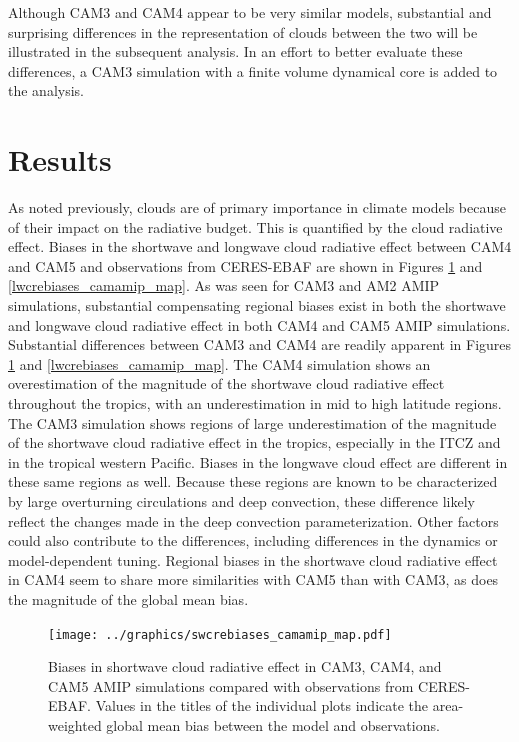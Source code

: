 Although CAM3 and CAM4 appear to be very similar models, substantial and surprising differences in the representation of clouds between the two will be illustrated in the subsequent analysis. In an effort to better evaluate these differences, a CAM3 simulation with a finite volume dynamical core is added to the analysis.

\section{Results}
As noted previously, clouds are of primary importance in climate models because of their impact on the radiative budget. This is quantified by the cloud radiative effect. Biases in the shortwave and longwave cloud radiative effect between CAM4 and CAM5 and observations from CERES-EBAF are shown in Figures \ref{swcrebiases_camamip_map} and \ref{lwcrebiases_camamip_map}. As was seen for CAM3 and AM2 AMIP simulations, substantial compensating regional biases exist in both the shortwave and longwave cloud radiative effect in both CAM4 and CAM5 AMIP simulations. Substantial differences between CAM3 and CAM4 are readily apparent in Figures \ref{swcrebiases_camamip_map} and \ref{lwcrebiases_camamip_map}. The CAM4 simulation shows an overestimation of the magnitude of the shortwave cloud radiative effect throughout the tropics, with an underestimation in mid to high latitude regions. The CAM3 simulation shows regions of large underestimation of the magnitude of the shortwave cloud radiative effect in the tropics, especially in the ITCZ and in the tropical western Pacific. Biases in the longwave cloud effect are different in these same regions as well. Because these regions are known to be characterized by large overturning circulations and deep convection, these difference likely reflect the changes made in the deep convection parameterization. Other factors could also contribute to the differences, including differences in the dynamics or model-dependent tuning. Regional biases in the shortwave cloud radiative effect in CAM4 seem to share more similarities with CAM5 than with CAM3, as does the magnitude of the global mean bias. 
\begin{figure}
    \centering
    \texttt{[image: ../graphics/swcrebiases\_camamip\_map.pdf]}
    \caption[Biases in shortwave cloud radiative effect in CAM3, CAM4, and CAM5 AMIP simulations compared with observations from CERES-EBAF.]{Biases in shortwave cloud radiative effect in CAM3, CAM4, and CAM5 AMIP simulations compared with observations from CERES-EBAF. Values in the titles of the individual plots indicate the area-weighted global mean bias between the model and observations.}
    \label{swcrebiases_camamip_map}
\end{figure}

